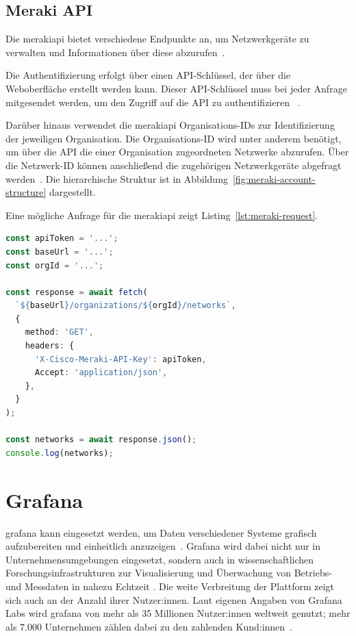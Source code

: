 \subsection{Meraki API}
\label{subsec:meraki-api}

Die \gls{merakiapi} bietet verschiedene Endpunkte an, um Netzwerkgeräte
zu verwalten und Informationen über diese abzurufen~\cite{cisco2026merakiapi}.

Die Authentifizierung erfolgt über einen API-Schlüssel, der über die
Weboberfläche erstellt werden kann. Dieser API-Schlüssel muss bei jeder
Anfrage mitgesendet werden, um den Zugriff auf die API zu authentifizieren
~\cite{cisco2026merakiauth}.

Darüber hinaus verwendet die \gls{merakiapi} Organisations-IDs zur
Identifizierung der jeweiligen Organisation. Die Organisations-ID wird
unter anderem benötigt, um über die API die einer Organisation
zugeordneten Netzwerke abzurufen. Über die Netzwerk-ID können anschließend
die zugehörigen Netzwerkgeräte abgefragt werden~\cite{cisco2026merakiapi}.
Die hierarchische Struktur ist in Abbildung~\ref{fig:meraki-account-structure}
dargestellt.

Eine mögliche Anfrage für die \gls{merakiapi} zeigt Listing~\ref{lst:meraki-request}.

\begin{lstlisting}[language=Typescript, caption={Request für Meraki Netzwerke}, label={lst:meraki-request}]
const apiToken = '...';
const baseUrl = '...';
const orgId = '...';

const response = await fetch(
  `${baseUrl}/organizations/${orgId}/networks`,
  {
    method: 'GET',
    headers: {
      'X-Cisco-Meraki-API-Key': apiToken,
      Accept: 'application/json',
    },
  }
);

const networks = await response.json();
console.log(networks);
\end{lstlisting}

\section{Grafana}
\label{sec:grafana}

\gls{grafana} kann eingesetzt werden, um Daten verschiedener Systeme grafisch 
aufzubereiten und einheitlich anzuzeigen~\cite{grafana2026about}. Grafana wird 
dabei nicht nur in Unternehmensumgebungen eingesetzt, sondern auch in wissenschaftlichen 
Forschungsinfrastrukturen zur Visualisierung und Überwachung von Betriebs- und 
Messdaten in nahezu Echtzeit \cite{VBondar2025}. Die weite Verbreitung der 
Plattform zeigt sich auch an der Anzahl ihrer Nutzer:innen. Laut eigenen Angaben 
von Grafana Labs wird \gls{grafana} von mehr als 35 Millionen Nutzer:innen weltweit 
genutzt; mehr als 7.000 Unternehmen zählen dabei zu den zahlenden Kund:innen~\cite{grafana2026pressrelease}.

